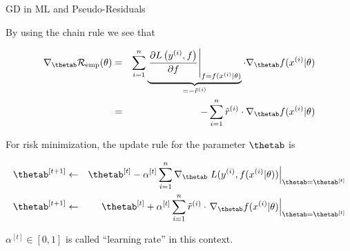 \begin{vbframe}{GD in ML and Pseudo-Residuals}

By using the chain rule we see that 

\vspace*{-0.5cm}

\begin{footnotesize}
\begin{eqnarray*}
\nabla_{\thetab} \risket &=&\sumin \underbrace{\left.\frac{\partial L\left(\yi, f\right)}{\partial f} \right|_{f = \fxit} }_{= - \tilde r^{(i)}}
\cdot \nabla_{\thetab} \fxit \\ 
&=& - \sumin \tilde r^{(i)} \cdot \nabla_{\thetab} \fxit
\end{eqnarray*}
\end{footnotesize}

For risk minimization, the update rule for the parameter $\thetab$ is 
\begin{footnotesize}
\begin{eqnarray*}
\thetab^{[t+1]} &\leftarrow & \thetab^{[t]} - \alpha^{[t]}  \sumin \nabla_{\thetab} \left. \Lxyit \right|_{\thetab = \thetab^{[t]}} \\
\thetab^{[t+1]} &\leftarrow & \thetab^{[t]} + \alpha^{[t]} \sumin \tilde r^{(i)} \cdot \left. \nabla_{\thetab} \fxit \right|_{\thetab = \thetab^{[t]}} 
\end{eqnarray*}
\end{footnotesize}
$\alpha^{[t]} \in [0,1]$ is called \enquote{learning rate} in this context.
\end{vbframe}



